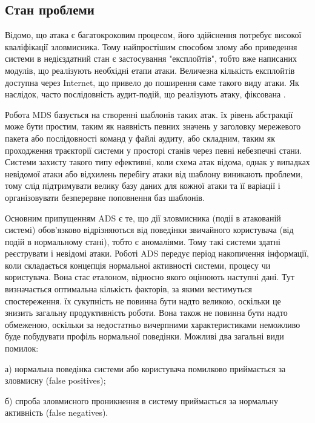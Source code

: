 \newpage
{}
\subsection{Стан проблеми \TBD}

\TBD

Відомо, що атака є багатокроковим процесом, його здійснення потребує високої кваліфікації зловмисника. Тому найпростішим способом злому або приведення системи в недієздатний стан є застосування "експлойтів", тобто вже написаних модулів, що реалізують необхідні етапи атаки. Величезна кількість експлойтів доступна через Internet, що привело до поширення саме такого виду атаки. Як наслідок, часто послідовність аудит-подій, що реалізують атаку, фіксована \cite{kolodchak2012modern}.

Робота MDS базується на створенні шаблонів таких атак. їх рівень абстракції може бути простим, таким як наявність певних значень у заголовку мережевого пакета або послідовності команд у файлі аудиту, або складним, таким як проходження траєкторії системи у просторі станів через певні небезпечні стани. Системи захисту такого типу ефективні, коли схема атак відома, однак у випадках невідомої атаки або відхилень перебігу атаки від шаблону виникають проблеми, тому слід підтримувати велику базу даних для кожної атаки та її варіації і організовувати безперервне поповнення баз шаблонів.

Основним припущенням ADS є те, що дії зловмисника (події в атакованій системі) обов'язково відрізняються від поведінки звичайного користувача (від подій в нормальному стані), тобто є аномаліями. Тому такі системи здатні реєструвати і невідомі атаки. Роботі ADS передує період накопичення інформації, коли складається концепція нормальної активності системи, процесу чи користувача. Вона стає еталоном, відносно якого оцінюють наступні дані. Тут визначається оптимальна кількість факторів, за якими вестимуться спостереження. їх сукупність не повинна бути надто великою, оскільки це знизить загальну продуктивність роботи. Вона також не повинна бути надто обмеженою, оскільки за недостатньо вичерпними характеристиками неможливо буде побудувати профіль нормальної поведінки. Можливі два загальні види помилок:

а) нормальна поведінка системи або користувача помилково приймається за зловмисну (false positives);

б) спроба зловмисного проникнення в систему приймається за нормальну активність (false negatives).

